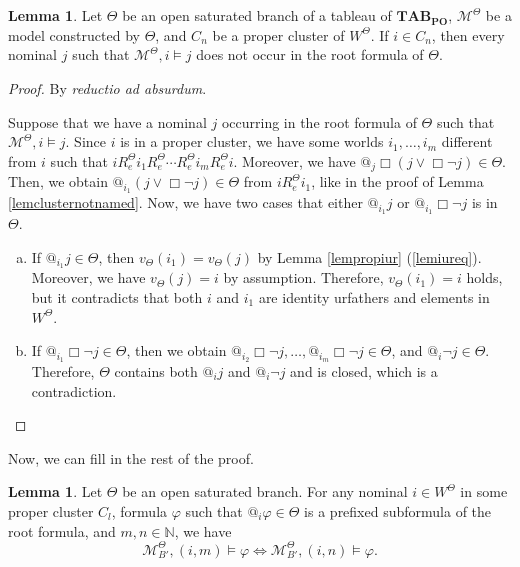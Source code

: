 \documentclass{article}
\theoremstyle{definition}
\newtheorem{lemma}[definition]{Lemma}
\newcommand{\Kmodel}{\mathcal{M}}
\newcommand{\tableauPO}{\mathbf{TAB}_{\textbf{PO}}}
\begin{document}
\begin{lemma}
    Let $\Theta$ be an open saturated branch of a tableau of $\tableauPO$, $\Kmodel^\Theta$ be a model constructed by $\Theta$, and $C_n$ be a proper cluster of $W^\Theta$. If $i \in C_n$, then every nominal $j$ such that $\Kmodel^\Theta, i \models j$ does not occur in the root formula of $\Theta$.
    \label{lemclusternotnamedPO}
\end{lemma}
\begin{proof}
    By \textit{reductio ad absurdum}.
    
     Suppose that we have a nominal $j$ occurring in the root formula of $\Theta$ such that $\Kmodel^\Theta, i \models j$. Since $i$ is in a proper cluster, we have some worlds $i_1, \ldots, i_m$ different from $i$ such that $i R_e^\Theta i_1 R_e^\Theta \cdots R_e^\Theta i_m R_e^\Theta i$. Moreover, we have $@_j \Box (j \lor \Box \neg j) \in \Theta$. Then, we obtain $@_{i_1} (j \lor \Box \neg j) \in \Theta$ from $i R_e^\Theta i_1$, like in the proof of Lemma \ref{lemclusternotnamed}. Now, we have two cases that either $@_{i_1} j$ or $@_{i_1} \Box \neg j$ is in $\Theta$.
     \begin{enumerate}[(a)]
         \item If $@_{i_1} j \in \Theta$, then $v_\Theta(i_1) = v_\Theta(j)$ by Lemma \ref{lempropiur} (\ref{lemiureq}). Moreover, we have $v_\Theta(j) = i$ by assumption. Therefore, $v_\Theta(i_1) = i$ holds, but it contradicts that both $i$ and $i_1$ are identity urfathers and elements in $W^\Theta$.
         \item If $@_{i_1} \Box \neg j \in \Theta$, then we obtain $@_{i_2} \Box \neg j, \ldots, @_{i_m} \Box \neg j \in \Theta$, and $@_i \neg j \in \Theta$. Therefore, $\Theta$ contains both $@_i j$ and $@_i \neg j$ and is closed, which is a contradiction. \qedhere
     \end{enumerate}
\end{proof}

Now, we can fill in the rest of the proof. 

\begin{lemma}
    Let $\Theta$ be an open saturated branch. For any nominal $i \in W^\Theta$ in some proper cluster $C_l$, formula $\varphi$ such that $@_i \varphi \in \Theta$ is a prefixed subformula of the root formula, and $m, n \in \mathbb{N}$, we have
    \[
        \Kmodel^\Theta_{B'}, (i, m) \models \varphi \iff \Kmodel^\Theta_{B'}, (i, n) \models \varphi.
    \]
    \label{lemclusterequivPO}
\end{lemma}
\end{document}
